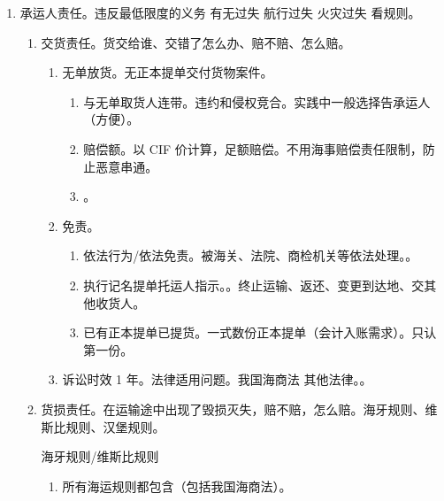 \begin{enumerate}
        \begin{kk}{海运单}
          航程较短的运输。单货一起。不是物权凭证。不能转让、流通。仅作为运输合同证明和货物收据。
        \end{kk}
  \item 承运人责任。违反最低限度的义务 \yjt 有无过失 \yjt 航行过失 \yjt 火灾过失 \yjt 看规则。
        \begin{enumerate}
          \item 交货责任。货交给谁、交错了怎么办、赔不赔、怎么赔。
                \begin{enumerate}
                  \item 无单放货。无正本提单交付货物案件。
                        \begin{enumerate}
                          \item 与无单取货人连带。违约和侵权竞合。实践中一般选择告承运人（方便）。
                          \item 赔偿额。以 CIF 价计算，足额赔偿。不用海事赔偿责任限制，防止恶意串通。
                          \item {}。
                        \end{enumerate}
                  \item 免责。
                        \begin{enumerate}
                          \item 依法行为/依法免责。被海关、法院、商检机关等依法处理。。
                          \item 执行记名提单托运人指示。。终止运输、返还、变更到达地、交其他收货人。
                          \item 已有正本提单已提货。一式数份正本提单（会计入账需求）。只认第一份。
                        \end{enumerate}
                  \item 诉讼时效 1 年。法律适用问题。我国海商法 \dy 其他法律。。
                \end{enumerate}
          \item 货损责任。在运输途中出现了毁损灭失，赔不赔，怎么赔。海牙规则、维斯比规则、汉堡规则。
                \begin{kk}{海牙规则/维斯比规则}
                  \begin{enumerate}
                    \item 所有海运规则都包含（包括我国海商法）。

\end{enumerate}
\end{kk}
\end{enumerate}
\end{enumerate}
